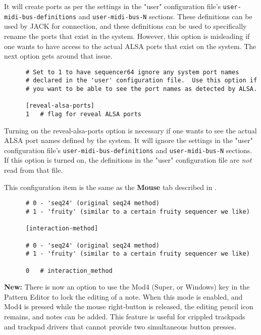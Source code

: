    It will create ports as per the settings in the "user" configuration file's
   \texttt{user-midi-bus-definitions} and \texttt{user-midi-bus-N} sections.
   These definitions can be used by JACK for connection, and these definitions
   can be used to specifically rename the ports that exist in the system.
   However, this option is misleading if one wants to have access to the
   actual ALSA ports that exist on the system.
   The next option gets around that issue.

   \begin{verbatim}
      # Set to 1 to have sequencer64 ignore any system port names
      # declared in the 'user' configuration file.  Use this option if
      # you want to be able to see the port names as detected by ALSA.

      [reveal-alsa-ports]
      1   # flag for reveal ALSA ports
   \end{verbatim}

   Turning on the reveal-alsa-ports option is necessary if one
   wants to see the actual ALSA port names defined by the system.
   It will ignore the settings in the "user" configuration file's
   \texttt{user-midi-bus-definitions} and \texttt{user-midi-bus-N} sections.
   If this option is turned on, the definitions in the
   "user" configuration file are \textsl{not} read from that file.

   This configuration item is the same as the 
   \textbf{Mouse} tab described in
   .

   \begin{verbatim}
      # 0 - 'seq24' (original seq24 method)
      # 1 - 'fruity' (similar to a certain fruity sequencer we like)

      [interaction-method]

      # 0 - 'seq24' (original seq24 method)
      # 1 - 'fruity' (similar to a certain fruity sequencer we like)

      0   # interaction_method
   \end{verbatim}

   \textbf{New:}
   There is now an option to use the Mod4 (Super, or Windows) key in the
   Pattern Editor to lock the editing of a note.  When this mode is enabled,
   and Mod4 is pressed while the mouse right-button is released, the
   editing pencil icon remains, and notes can be added.  This feature is
   useful for crippled trackpads and trackpad drivers that cannot provide
   two simultaneous button presses.

